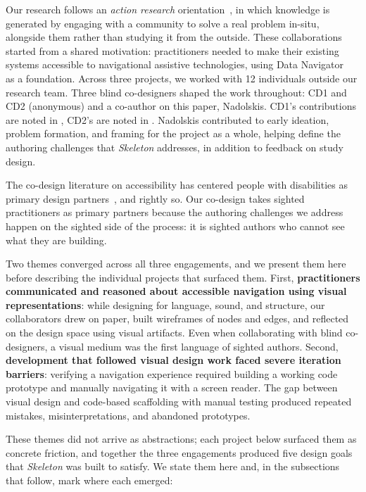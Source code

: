 \documentclass[12pt]{cmuthesis}
\begin{document}
Our research follows an \textit{action research} orientation~\cite{Hayes2011ActionResearch}, in which knowledge is generated by engaging with a community to solve a real problem in-situ, alongside them rather than studying it from the outside. These collaborations started from a shared motivation: practitioners needed to make their existing systems accessible to navigational assistive technologies, using Data Navigator~\cite{Elavsky2023} as a foundation. Across three projects, we worked with 12 individuals outside our research team. Three blind co-designers shaped the work throughout: CD1 and CD2 (anonymous) and a co-author on this paper, Nadolskis. CD1's contributions are noted in , CD2's are noted in . Nadolskis contributed to early ideation, problem formation, and framing for the project as a whole, helping define the authoring challenges that \textit{Skeleton} addresses, in addition to feedback on study design.

The co-design literature on accessibility has centered people with disabilities as primary design partners~\cite{Cullen2019Co, Race2023, deGreef2021Interdependent, Thompson2023Chart, Zong2022Rich, Zong2025}, and rightly so. Our co-design takes sighted practitioners as primary partners because the authoring challenges we address happen on the sighted side of the process: it is sighted authors who cannot see what they are building.

Two themes converged across all three engagements, and we present them here before describing the individual projects that surfaced them. First, \textbf{practitioners communicated and reasoned about accessible navigation using visual representations}: while designing for language, sound, and structure, our collaborators drew on paper, built wireframes of nodes and edges, and reflected on the design space using visual artifacts. Even when collaborating with blind co-designers, a visual medium was the first language of sighted authors. Second, \textbf{development that followed visual design work faced severe iteration barriers}: verifying a navigation experience required building a working code prototype and manually navigating it with a screen reader. The gap between visual design and code-based scaffolding with manual testing produced repeated mistakes, misinterpretations, and abandoned prototypes.

These themes did not arrive as abstractions; each project below surfaced them as concrete friction, and together the three engagements produced five design goals that \textit{Skeleton} was built to satisfy. We state them here and, in the subsections that follow, mark where each emerged:
\end{document}
